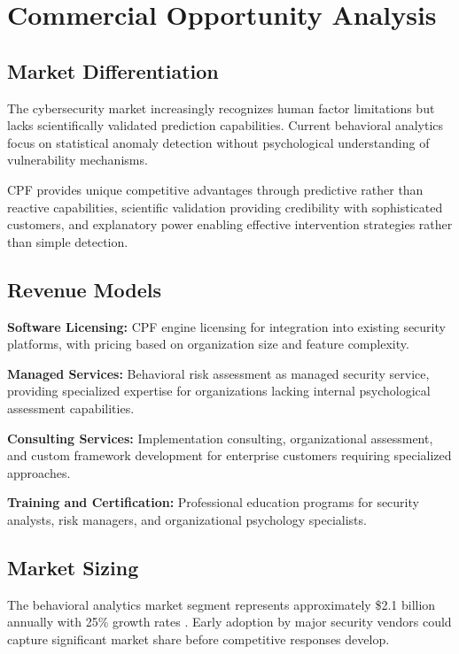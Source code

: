 \documentclass[10pt,twocolumn]{IEEEtran}
\begin{document}
\section{Commercial Opportunity Analysis}

\subsection{Market Differentiation}

The cybersecurity market increasingly recognizes human factor limitations but lacks scientifically validated prediction capabilities. Current behavioral analytics focus on statistical anomaly detection without psychological understanding of vulnerability mechanisms.

CPF provides unique competitive advantages through predictive rather than reactive capabilities, scientific validation providing credibility with sophisticated customers, and explanatory power enabling effective intervention strategies rather than simple detection.

\subsection{Revenue Models}

\textbf{Software Licensing:} CPF engine licensing for integration into existing security platforms, with pricing based on organization size and feature complexity.

\textbf{Managed Services:} Behavioral risk assessment as managed security service, providing specialized expertise for organizations lacking internal psychological assessment capabilities.

\textbf{Consulting Services:} Implementation consulting, organizational assessment, and custom framework development for enterprise customers requiring specialized approaches.

\textbf{Training and Certification:} Professional education programs for security analysts, risk managers, and organizational psychology specialists.

\subsection{Market Sizing}

The behavioral analytics market segment represents approximately \$2.1 billion annually with 25\% growth rates \cite{marketsandmarkets2023}. Early adoption by major security vendors could capture significant market share before competitive responses develop.
\end{document}

